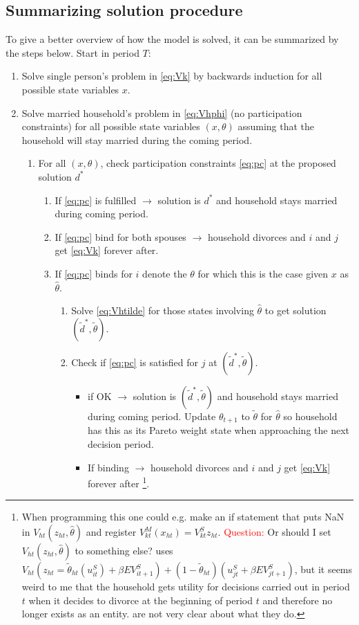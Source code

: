 \subsection{Summarizing solution procedure} \label{sec:solutionproc}
To give a better overview of how the model is solved, it can be summarized by the steps below. Start in period $T$:
\begin{enumerate} 
\item Solve single person's problem in \eqref{eq:Vk} by backwards induction for all possible state variables $x$. \label{enum:solve_start}
\item Solve married household's problem in \eqref{eq:Vhphi} (no participation constraints) for all possible state variables $(x,\theta)$ assuming that the household will stay married during the coming period. \label{enum:solvehh}
\begin{enumerate}
\item For all $(x,\theta)$, check participation constraints \eqref{eq:pc} at the proposed solution $d^*$ \label{enum:checkpc}
\begin{enumerate}
\item If \eqref{eq:pc} is fulfilled $\rightarrow$ solution is $d^*$ and household stays married during coming period.
\item If \eqref{eq:pc} bind for both spouses $\rightarrow$ household divorces and $i$ and $j$ get \eqref{eq:Vk} forever after.
\item If \eqref{eq:pc} binds for $i$ denote the $\theta$ for which this is the case given $x$ as $\hat{\theta}$. 
\begin{enumerate}
\item Solve \eqref{eq:Vhtilde} for those states involving $\hat{\theta}$ to get solution $(\tilde{d}^*,\tilde{\theta})$. \label{enum:solveagain}
\item Check if \eqref{eq:pc} is satisfied for $j$ at $(\tilde{d}^*,\tilde{\theta})$.
\begin{itemize}
	\item if OK $\rightarrow$ solution is $(\tilde{d}^*,\tilde{\theta})$ and household stays married during coming period. Update $\theta_{t+1}$ to $\tilde{\theta}$ for $\hat{\theta}$ so household has this as its Pareto weight state when approaching the next decision period.
	\item If binding $\rightarrow$ household divorces and $i$ and $j$ get \eqref{eq:Vk} forever after
	\footnote{When programming this one could e.g. make an if statement that puts NaN in $V_{ht}(z_{ht},\hat{\theta})$ and register $V_{kt}^M(x_{ht}) = V_{kt}^S{z_{ht}}$. \textcolor{red}{Question:} Or should I set $V_{ht}(z_{ht},\hat{\theta})$ to something else? \cite{Voena2015} uses $V_{ht}(z_{ht}=\tilde{\theta}_{ht}(u_{it}^S)+\beta EV_{it+1}^S)+(1-\tilde{\theta}_{ht})(u_{jt}^S+\beta EV_{jt+1}^S)$, but it seems weird to me that the household gets utility for decisions carried out in period $t$ when it decides to divorce at the beginning of period $t$ and therefore no longer exists as an entity. \cite{Mazzaoccoetal2013} are not very clear about what they do.}.

\end{itemize}
\end{enumerate}
\end{enumerate}
\end{enumerate}
\end{enumerate}

